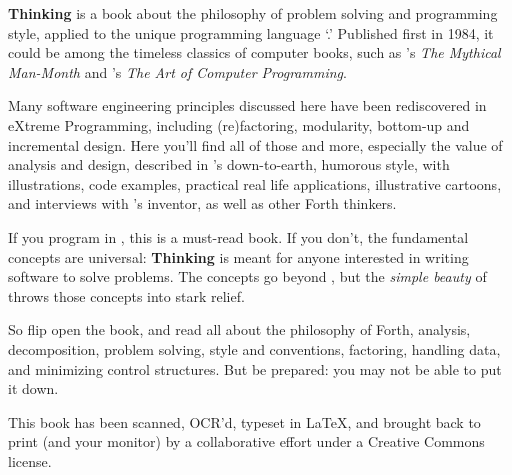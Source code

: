 
\noindent
\textbf{Thinking \Forth{}} is a book about the philosophy of problem
solving and programming style, applied to the unique programming
language `\Forth{}.' Published first in 1984, it could be among the
timeless classics of computer books, such as 's
\emph{The Mythical Man-Month} and 's \emph{The
Art of Computer Programming}.

Many software engineering principles discussed here have been
rediscovered in eXtreme Programming, including (re)factoring,
modularity, bottom-up and incremental design.  Here you'll find all of
those and more, especially the value of analysis and design, described
in 's down-to-earth, humorous style, with
illustrations, code examples, practical real life applications,
illustrative cartoons, and interviews with \Forth{}'s inventor,
 as well as other Forth thinkers.

If you program in \Forth{}, this is a must-read book.  If you don't,
the fundamental concepts are universal: \textbf{Thinking \Forth{}} is
meant for anyone interested in writing software to solve problems.
The concepts go beyond \Forth{}, but the \emph{simple beauty} of
\Forth{} throws those concepts into stark relief.

So flip open the book, and read all about the philosophy of Forth,
analysis, decomposition, problem solving, style and conventions,
factoring, handling data, and minimizing control structures.  But be
prepared: you may not be able to put it down.

\medskip
This book has been scanned, OCR'd, typeset in \LaTeX{}, and brought
back to print (and your monitor) by a collaborative effort under a Creative
Commons license.

